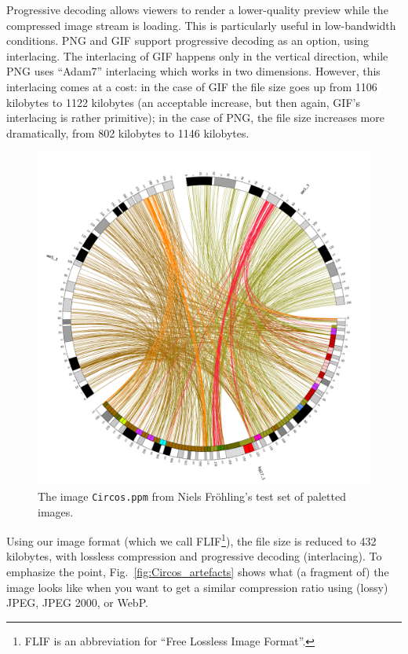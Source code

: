 \documentclass[a4paper,USenglish]{lipics}
\begin{document}
Progressive decoding allows viewers to render a lower-quality preview while the compressed image
stream is loading. This is particularly useful in low-bandwidth conditions.
PNG and GIF support progressive decoding as an option, using interlacing.
The interlacing of GIF happens only in the vertical direction, while PNG uses ``Adam7'' interlacing
which works in two dimensions. However, this interlacing comes at a cost:
in the case of GIF the file size goes up from 1106 kilobytes to 1122 kilobytes (an acceptable increase, but
then again, GIF's interlacing is rather primitive); in the case of PNG, the file size increases
more dramatically, from 802 kilobytes to 1146 kilobytes.


\begin{figure}
\begin{center}
\begin{minipage}[b]{0.7\textwidth}
\includegraphics[width=\textwidth]{images/Circos}
\end{minipage}
\end{center}
\caption{ The image {\tt Circos.ppm} from Niels Fr\"ohling's test set of paletted images.}
\label{fig:Circos}
\end{figure}

Using our image format (which we call FLIF\footnote{FLIF is an abbreviation for ``Free Lossless Image Format''.}),
the file size is reduced to 432 kilobytes, with lossless compression and progressive decoding (interlacing).
To emphasize the point, Fig.~\ref{fig:Circos_artefacts} shows
what (a fragment of) the image looks like when you want to get a similar compression ratio
using (lossy) JPEG, JPEG 2000, or WebP.
\end{document}
